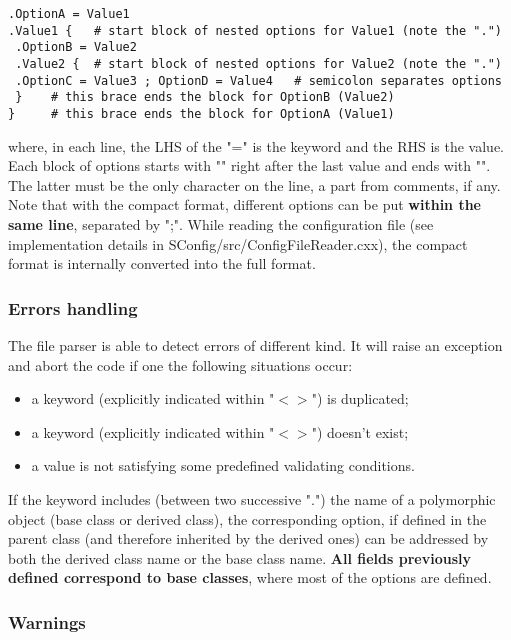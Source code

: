 \documentclass[11pt]{article}
\begin{document}
\vspace{-0.2cm}
\begin{verbatim}
.OptionA = Value1 
.Value1 {   # start block of nested options for Value1 (note the ".")
 .OptionB = Value2 
 .Value2 {  # start block of nested options for Value2 (note the ".")
 .OptionC = Value3 ; OptionD = Value4   # semicolon separates options
 }    # this brace ends the block for OptionB (Value2)
}     # this brace ends the block for OptionA (Value1)
\end{verbatim} 
where, in each line, the LHS of the "=" is the keyword and the RHS is
the value. Each block of options starts with "{" right after the last
  value and ends with "}". The latter must be the only character on
the line, a part from comments, if any. Note that with the compact 
format, different options can be put \textbf{within the same line}, 
separated by ";".  While reading the configuration file 
(see implementation details in SConfig/src/ConfigFileReader.cxx), 
the compact format is internally converted into the full format.

\subsubsection{Errors handling}

The file parser is able to detect errors of different kind. It will
raise an exception and abort the code if one the following situations
occur:

\begin{itemize}
\item
  a keyword (explicitly indicated within "$<>$") is duplicated;
\item
  a keyword (explicitly indicated within "$<>$") doesn't exist;
\item 
  a value is not satisfying some predefined validating conditions.
\end{itemize}
If the keyword includes (between two successive ".") the name of a
polymorphic object (base class or derived class), the corresponding
option, if defined in the parent class (and therefore inherited by the
derived ones) can be addressed by both the derived class name or the 
base class name. {\bf All fields previously defined correspond to base
  classes}, where most of the options are defined. 

\subsubsection{Warnings}\label{sssec:warnings}
\end{document}
